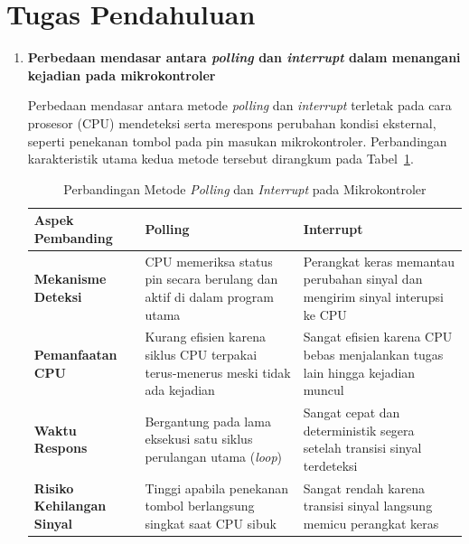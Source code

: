 \section{Tugas Pendahuluan}
\begin{enumerate}[label=\textbf{\arabic*.}, leftmargin=*, itemsep=10pt]

    \item \textbf{Perbedaan mendasar antara \textit{polling} dan \textit{interrupt} dalam menangani kejadian pada mikrokontroler}

    Perbedaan mendasar antara metode \textit{polling} dan \textit{interrupt} terletak pada cara prosesor (CPU) mendeteksi serta merespons perubahan kondisi eksternal, seperti penekanan tombol pada pin masukan mikrokontroler. Perbandingan karakteristik utama kedua metode tersebut dirangkum pada Tabel~\ref{tab:polling_vs_interrupt}.

    \begin{table}[h!]
        \centering
        \caption{Perbandingan Metode \textit{Polling} dan \textit{Interrupt} pada Mikrokontroler}
        \label{tab:polling_vs_interrupt}
        \vspace{4pt}
        \begin{tabularx}{\textwidth}{>{\bfseries}l X X}
            \toprule
            Aspek Pembanding & Polling & Interrupt \\
            \midrule
            Mekanisme Deteksi & CPU memeriksa status pin secara berulang dan aktif di dalam program utama & Perangkat keras memantau perubahan sinyal dan mengirim sinyal interupsi ke CPU \\
            \addlinespace[4pt]
            Pemanfaatan CPU & Kurang efisien karena siklus CPU terpakai terus-menerus meski tidak ada kejadian & Sangat efisien karena CPU bebas menjalankan tugas lain hingga kejadian muncul \\
            \addlinespace[4pt]
            Waktu Respons & Bergantung pada lama eksekusi satu siklus perulangan utama (\textit{loop}) & Sangat cepat dan deterministik segera setelah transisi sinyal terdeteksi \\
            \addlinespace[4pt]
            Risiko Kehilangan Sinyal & Tinggi apabila penekanan tombol berlangsung singkat saat CPU sibuk & Sangat rendah karena transisi sinyal langsung memicu perangkat keras \\
            \bottomrule
        \end{tabularx}
    \end{table}


\end{enumerate}
